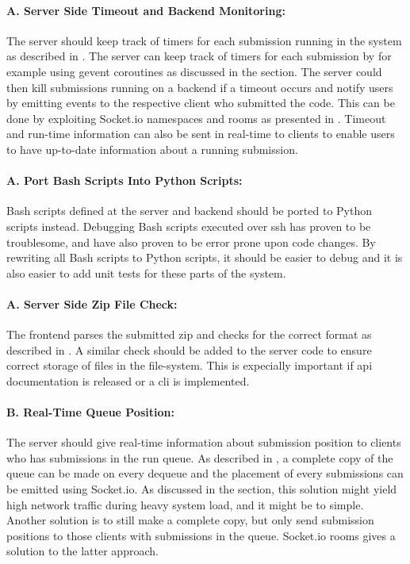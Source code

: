 \paragraph*{A. Server Side Timeout and Backend Monitoring:} The server should keep track of timers for each submission running in the system as described in . The server can keep track of timers for each submission by for example using gevent coroutines \cite{GEVENT} as discussed in the section. The server could then kill submissions running on a backend if a timeout occurs and notify users by emitting events to the respective client who submitted the code. This can be done by exploiting Socket.io namespaces and rooms as presented in . Timeout and run-time information can also be sent in real-time to clients to enable users to have up-to-date information about a running submission.

\paragraph*{A. Port Bash Scripts Into Python Scripts:} Bash scripts defined at the server and backend should be ported to Python scripts instead. Debugging Bash scripts executed over \gls{ssh} has proven to be troublesome, and have also proven to be error prone upon code changes. By rewriting all Bash scripts to Python scripts, it should be easier to debug and it is also easier to add unit tests for these parts of the system.

\paragraph*{A. Server Side Zip File Check:} The frontend parses the submitted zip and checks for the correct format as described in . A similar check should be added to the server code to ensure correct storage of files in the file-system. This is expecially important if \gls{api} documentation is released or a \gls{cli} is implemented.

\paragraph*{B. Real-Time Queue Position:} The server should give real-time information about submission position to clients who has submissions in the run queue. As described in , a complete copy of the queue can be made on every dequeue and the placement of every submissions can be emitted using Socket.io. As discussed in the section, this solution might yield high network traffic during heavy system load, and it might be to simple. Another solution is to still make a complete copy, but only send submission positions to those clients with submissions in the queue. Socket.io rooms gives a solution to the latter approach.

